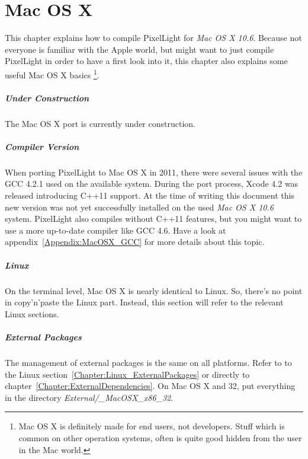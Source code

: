 \chapter{Mac OS X}
This chapter explains how to compile PixelLight for \emph{Mac OS X 10.6}. Because not everyone is familiar with the Apple world, but might want to just compile PixelLight in order to have a first look into it, this chapter also explains some useful Mac OS X basics \footnote{Mac OS X is definitely made for end users, not developers. Stuff which is common on other operation systems, often is quite good hidden from the user in the Mac world.}.


\paragraph{Under Construction}
The Mac OS X port is currently under construction.


\paragraph{Compiler Version}
When porting PixelLight to Mac OS X in 2011, there were several issues with the \ac{GCC} 4.2.1 used on the available system. During the port process, Xcode 4.2 was released introducing C++11 support. At the time of writing this document this new version was not yet successfully installed on the used \emph{Mac OS X 10.6} system. PixelLight also compiles without C++11 features, but you might want to use a more up-to-date compiler like \ac{GCC} 4.6. Have a look at appendix~\ref{Appendix:MacOSX_GCC} for more details about this topic.


\paragraph{Linux}
On the terminal level, Mac OS X is nearly identical to Linux. So, there's no point in copy'n'paste the Linux part. Instead, this section will refer to the relevant Linux sections.


\paragraph{External Packages}
The management of external packages is the same on all platforms. Refer to to the Linux section~\ref{Chapter:Linux_ExternalPackages} or directly to chapter~\ref{Chapter:ExternalDependencies}. On Mac OS X and \SI{32}{\bit}, put everything in the directory \emph{External/\_MacOSX\_x86\_32}.


